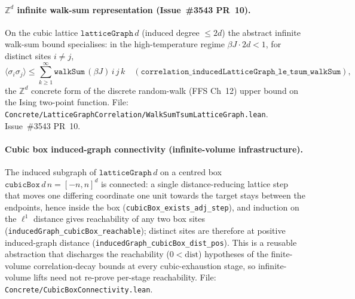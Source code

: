 \documentclass[a4paper,11pt]{article}
\begin{document}
\paragraph{$\mathbb Z^d$ infinite walk-sum representation (Issue~\#3543 PR~10).}
On the cubic lattice $\texttt{latticeGraph}\,d$ (induced degree $\le 2d$) the
abstract infinite walk-sum bound specialises: in the high-temperature regime
$\beta J \cdot 2d < 1$, for distinct sites $i \ne j$,
\[
  \langle\sigma_i\sigma_j\rangle
    \le \sum_{k\ge 1}^{\infty} \texttt{walkSum}\,(\beta J)\,i\,j\,k
  \quad (\texttt{correlation\_inducedLatticeGraph\_le\_tsum\_walkSum}),
\]
the $\mathbb Z^d$ concrete form of the discrete random-walk (FFS Ch~12) upper
bound on the Ising two-point function. File:
\texttt{Concrete/LatticeGraphCorrelation/WalkSumTsumLatticeGraph.lean}.
Issue~\#3543 PR~10.

\paragraph{Cubic box induced-graph connectivity (infinite-volume infrastructure).}
The induced subgraph of $\texttt{latticeGraph}\,d$ on a centred box
$\texttt{cubicBox}\,d\,n = [-n,n]^d$ is connected: a single distance-reducing
lattice step that moves one differing coordinate one unit towards the target stays
between the endpoints, hence inside the box
(\texttt{cubicBox\_exists\_adj\_step}), and induction on the $\ell^1$ distance
gives reachability of any two box sites
(\texttt{inducedGraph\_cubicBox\_reachable}); distinct sites are therefore at
positive induced-graph distance (\texttt{inducedGraph\_cubicBox\_dist\_pos}). This
is a reusable abstraction that discharges the reachability ($0 < \mathrm{dist}$)
hypotheses of the finite-volume correlation-decay bounds at every cubic-exhaustion
stage, so infinite-volume lifts need not re-prove per-stage reachability. File:
\texttt{Concrete/CubicBoxConnectivity.lean}.
\end{document}
